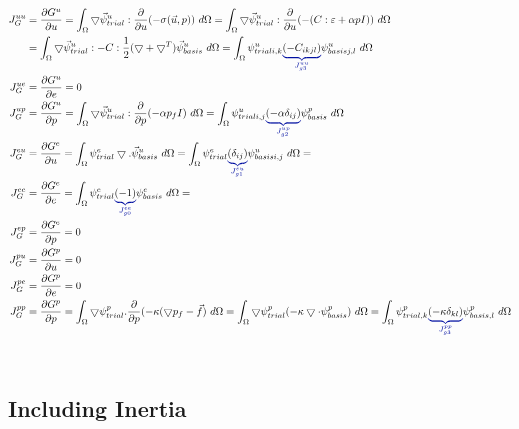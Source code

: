 \begin{align}
J_G^{uu} &= \frac{\partial G^u}{\partial u} = \int_{\Omega} \bigtriangledown \vec{\psi}_{trial}^u : \frac{\partial}{\partial u} (- \sigma(\vec{u},p)) \ d\Omega = \int_{\Omega} \bigtriangledown \vec{\psi}_{trial}^u : \frac{\partial}{\partial u} (-(C:\varepsilon +\alpha p I)) \ d\Omega \\
&= \int_{\Omega} \bigtriangledown \vec{\psi}_{trial}^u : -C: \frac{1}{2} 
(\bigtriangledown + \bigtriangledown^T) \vec{\psi}_{basis}^u \ d\Omega = 
\int_{\Omega} \psi_{trial i,k}^u 
\eqnannotate{\left(-C_{ikjl}\right)}{J_{g3}^{uu}} \psi_{basis j,l}^u \ d\Omega 
\\
%
J_G^{ue} &= \frac{\partial G^u}{\partial e} = 0 \\
%
J_G^{up} &= \frac{\partial G^u}{\partial p} = \int_{\Omega} \bigtriangledown 
\vec{\psi}_{trial}^u : \frac{\partial}{\partial p} (-\alpha p_f I) \ d\Omega = 
\int_{\Omega} \psi_{trial i,j}^u \eqnannotate{\left(-\alpha 
\delta_{ij}\right)}{J_{g2}^{up}} \psi_{basis}^p \ d\Omega \\
%
J_G^{eu} &= \frac{\partial G^e}{\partial u} = \int_{\Omega} \psi_{trial}^e  
\bigtriangledown . \vec{\psi}_{basis}^u \ d\Omega = \int_{\Omega} \psi_{trial}^e 
\eqnannotate{\left(\delta_{ij}\right)}{J_{g1}^{eu}} \psi_{basis i,j}^u \ 
d\Omega = \\
%
J_G^{ee} &= \frac{\partial G^e}{\partial e} = \int_{\Omega} \psi_{trial}^e 
\eqnannotate{\left(-1\right)}{J_{g0}^{ee}} \psi_{basis}^e \ d\Omega = \\
%
J_G^{ep} &= \frac{\partial G^e}{\partial p} = 0 \\
%
J_G^{pu} &= \frac{\partial G^p}{\partial u} = 0 \\
%
J_G^{pe} &= \frac{\partial G^p}{\partial e} = 0 \\
%
J_G^{pp} &= \frac{\partial G^p}{\partial p} = \int_{\Omega} \bigtriangledown 
\psi_{trial}^p. \frac{\partial}{\partial p} (-\kappa (\bigtriangledown p_f - 
\vec{f}) \ d\Omega = \int_{\Omega} \bigtriangledown \psi_{trial}^ p (- \kappa 
\bigtriangledown \cdot \psi_{basis}^p) \ d\Omega = \int_{\Omega} 
\psi_{trial,k}^p \eqnannotate{\left(- \kappa \delta_{kl}\right)}{J_{g3}^{pp}} 
\psi_{basis,l}^p \ d\Omega \\
\end{align} \\


\subsection{Including Inertia}

